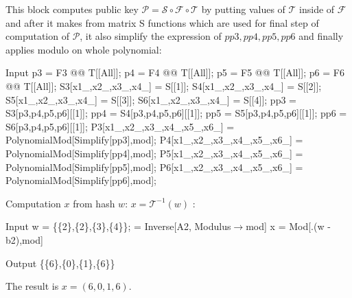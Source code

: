\documentclass[thesis=M,english]{FITthesis}[2019/12/23]
\begin{document}
\noindent
This block computes public key $\mathcal{P} = \mathcal{S} \circ \mathcal{F} \circ \mathcal{T}$ by putting values of $\mathcal{T}$ inside of $\mathcal{F}$ and after it makes from matrix S functions which are used for final step of computation of $\mathcal{P}$, it also simplify the expression of $pp3,pp4,pp5,pp6$ and finally applies modulo on whole polynomial:
\begin{mmaCell}[moredefined={p3, p4, p5, p6, S3, S4, S5, S6, mod, P3, P4, P5, P6, pp3,pp4,pp5,pp6, F3, F4, F5,F6, T, S},morepattern={x1_, x2_, x3_, x4_, x5_, x6_}]{Input}
p3 = F3 @@ T[[All]];
p4 = F4 @@ T[[All]];
p5 = F5 @@ T[[All]];
p6 = F6 @@ T[[All]];
S3[x1_,x2_,x3_,x4_] = S[[1]];
S4[x1_,x2_,x3_,x4_] = S[[2]];
S5[x1_,x2_,x3_,x4_] = S[[3]];
S6[x1_,x2_,x3_,x4_] = S[[4]];
pp3 = S3[p3,p4,p5,p6][[1]];
pp4 = S4[p3,p4,p5,p6][[1]];
pp5 = S5[p3,p4,p5,p6][[1]];
pp6 = S6[p3,p4,p5,p6][[1]];
P3[x1_,x2_,x3_,x4_,x5_,x6_] = PolynomialMod[Simplify[pp3],mod];
P4[x1_,x2_,x3_,x4_,x5_,x6_] = PolynomialMod[Simplify[pp4],mod];
P5[x1_,x2_,x3_,x4_,x5_,x6_] = PolynomialMod[Simplify[pp5],mod];
P6[x1_,x2_,x3_,x4_,x5_,x6_] = PolynomialMod[Simplify[pp6],mod];
\end{mmaCell}

\noindent
Computation $x$ from hash $w$: $x = \mathcal{T}^{-1}(w)$ :
\begin{mmaCell}[moredefined={w, A2, b2, S, x, mod}]{Input}
w = \{\{2\},\{2\},\{3\},\{4\}\};
 = Inverse[A2, Modulus\(\pmb{\to}\)mod]
x = Mod[.(w - b2),mod]
\end{mmaCell}
\begin{mmaCell}{Output}
  \{\{6\},\{0\},\{1\},\{6\}\}
\end{mmaCell}

\noindent
The result is $x = (6,0,1,6)$.
\end{document}
